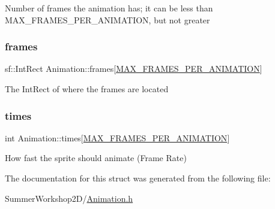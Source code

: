 Number of frames the animation has; it can be less than M\+A\+X\+\_\+\+F\+R\+A\+M\+E\+S\+\_\+\+P\+E\+R\+\_\+\+A\+N\+I\+M\+A\+T\+I\+ON, but not greater \mbox{\label{struct_animation_aa7b68d6cf873a92e2179b618379e3e8c}} 
\subsubsection{\texorpdfstring{frames}{frames}}
{\footnotesize\ttfamily sf\+::\+Int\+Rect Animation\+::frames\mbox{[}\hyperlink{_animation_8h_aefcfbff62033a5293157520b346713fb}{M\+A\+X\+\_\+\+F\+R\+A\+M\+E\+S\+\_\+\+P\+E\+R\+\_\+\+A\+N\+I\+M\+A\+T\+I\+ON}\mbox{]}}

The Int\+Rect of where the frames are located \mbox{\label{struct_animation_a3ba00e5e751106d59653fb6aaed2273a}} 
\subsubsection{\texorpdfstring{times}{times}}
{\footnotesize\ttfamily int Animation\+::times\mbox{[}\hyperlink{_animation_8h_aefcfbff62033a5293157520b346713fb}{M\+A\+X\+\_\+\+F\+R\+A\+M\+E\+S\+\_\+\+P\+E\+R\+\_\+\+A\+N\+I\+M\+A\+T\+I\+ON}\mbox{]}}

How fast the sprite should animate (Frame Rate) 

The documentation for this struct was generated from the following file\+:\begin{DoxyCompactItemize}
\item 
Summer\+Workshop2\+D/\hyperlink{_animation_8h}{Animation.\+h}\end{DoxyCompactItemize}
